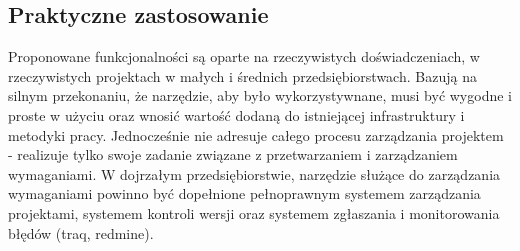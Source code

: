     \subsection{Praktyczne zastosowanie}
      Proponowane funkcjonalności są oparte na rzeczywistych doświadczeniach, w rzeczywistych projektach w małych i średnich przedsiębiorstwach. Bazują na silnym przekonaniu, że narzędzie, aby było wykorzystywnane, musi być wygodne i proste w użyciu oraz wnosić wartość dodaną do istniejącej infrastruktury i metodyki pracy. Jednocześnie nie adresuje całego procesu zarządzania projektem - realizuje tylko swoje zadanie związane z przetwarzaniem i zarządzaniem wymaganiami. W dojrzałym przedsiębiorstwie, narzędzie służące do zarządzania wymaganiami powinno być dopełnione pełnoprawnym systemem zarządzania projektami, systemem kontroli wersji oraz systemem zgłaszania i monitorowania błędów (traq, redmine).
